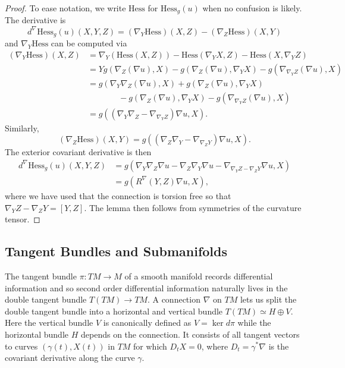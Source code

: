 \documentclass{amsart}
\begin{document}
\begin{proof}
To ease notation, we write $\mathrm{Hess}$ for $\mathrm{Hess}_g(u)$ when no confusion is likely.
The derivative is
\[
d^\nabla\mathrm{Hess}_g(u)(X,Y,Z) = (\nabla_Y\mathrm{Hess})(X,Z) - (\nabla_Z \mathrm{Hess})(X,Y)
\]
and $\nabla_Y\mathrm{Hess}$ can be computed via
\begin{align*}
(\nabla_Y\mathrm{Hess})(X,Z)
&= \nabla_Y(\mathrm{Hess}(X,Z)) - \mathrm{Hess}(\nabla_YX,Z) - \mathrm{Hess}(X,\nabla_YZ) \\
&= Yg(\nabla_Z(\nabla u),X) - g(\nabla_Z(\nabla u ), \nabla_YX) - g(\nabla_{\nabla_YZ}(\nabla u),X) \\
&= g(\nabla_Y \nabla_Z (\nabla u ), X) + g(\nabla_Z(\nabla u), \nabla_YX) \\
&\phantom{=} \hspace{1cm}  - g(\nabla_Z(\nabla u ), \nabla_YX) - g(\nabla_{\nabla_YZ}(\nabla u),X) \\
&= g( (\nabla_Y \nabla_Z  - \nabla_{\nabla_YZ})\nabla u, X).
\end{align*}
Similarly, 
\[
(\nabla_Z \mathrm{Hess})(X,Y) = g( (\nabla_Z \nabla_Y  - \nabla_{\nabla_ZY})\nabla u, X).
\]
The exterior covariant derivative is then 
\begin{align*}
d^\nabla\mathrm{Hess}_g(u)(X,Y,Z)
&= g( \nabla_Y \nabla_Z \nabla u - \nabla_Z \nabla_Y \nabla u - \nabla_{\nabla_YZ - \nabla_ZY} \nabla u , X) \\
&= g( R^\nabla(Y,Z)\nabla u ,X),
\end{align*}
where we have used that the connection is torsion free so that $\nabla_YZ - \nabla_ZY = [Y,Z]$.
The lemma then follows from symmetries of the curvature tensor. 
\end{proof}


\subsection{Tangent Bundles and Submanifolds}

The tangent bundle $\pi:TM \to M$ of a smooth manifold records differential information and so second order differential information naturally lives in the double tangent bundle $T(TM) \to TM$.
A connection $\nabla$ on $TM$ lets us split the double tangent bundle into a horizontal and vertical bundle $T(TM) \simeq H \oplus V$.
Here the vertical bundle $V$ is canonically defined as $V = \ker d\pi$ while the horizontal bundle $H$ depends on the connection.
It consists of all tangent vectors to curves $(\gamma(t),X(t))$ in $TM$ for which $D_tX = 0$, where $D_t = \gamma^*\nabla$ is the covariant derivative along the curve $\gamma$.
\end{document}
